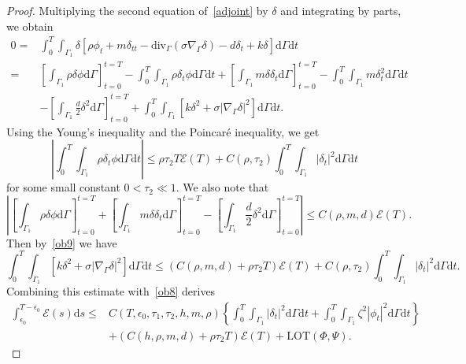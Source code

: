 \documentclass[10pt]{elsarticle}
\begin{document}
\begin{proof}
Multiplying the second equation of~\eqref{adjoint} by $\delta$ and integrating by parts, we obtain
\begin{equation}\label{ob9}
\begin{split}
0= &\int_{0}^{T}\int_{\Gamma_1}\delta\left[\rho\phi_t + m \delta_{tt} - \mathrm{div}_{\Gamma}\left(\sigma\nabla_{\Gamma} \delta\right) - d \delta_t + k \delta\right]\mathrm{d}\Gamma \mathrm{d}t\\
=&\left[ \int_{\Gamma_1}\rho\delta\phi\mathrm{d}\Gamma\right]_{t=0}^{t=T} -\int_{0}^{T}\int_{\Gamma_1}\rho\delta_t\phi \mathrm{d}\Gamma \mathrm{d}t +\left[ \int_{\Gamma_1}m\delta\delta_t\mathrm{d}\Gamma\right]_{t=0}^{t=T} -\int_{0}^{T}\int_{\Gamma_1}m\delta^2_t \mathrm{d}\Gamma \mathrm{d}t\\
&-\left[ \int_{\Gamma_1}\frac{d}{2}\delta^2\mathrm{d}\Gamma\right]_{t=0}^{t=T} +\int_{0}^{T}\int_{\Gamma_1}\left[k \delta^2 + \sigma|\nabla_{\Gamma} \delta|^2\right]\mathrm{d}\Gamma \mathrm{d}t.
\end{split}
\end{equation}
Using the Young's inequality and the Poincar\'e inequality, we get
\[
\left|\int_{0}^{T}\int_{\Gamma_1}\rho\delta_t\phi \mathrm{d}\Gamma \mathrm{d}t\right|\leqslant\rho\tau_2 T\mathcal{E}(T) + C(\rho, \tau_2)\int_{0}^{T}\int_{\Gamma_1}|\delta_t|^2 \mathrm{d}\Gamma \mathrm{d}t
\]
for some small constant $0<\tau_2\ll1$. We also note that
\[
\left| \left[ \int_{\Gamma_1}\rho\delta\phi\mathrm{d}\Gamma\right]_{t=0}^{t=T} + \left[ \int_{\Gamma_1}m\delta\delta_t\mathrm{d}\Gamma\right]_{t=0}^{t=T} -\left[ \int_{\Gamma_1}\frac{d}{2}\delta^2\mathrm{d}\Gamma\right]_{t=0}^{t=T}\right|\leqslant C(\rho, m, d)\mathcal{E}(T).
\]
Then by~\eqref{ob9} we have
\begin{equation}\label{ob9_1}
\int_{0}^{T}\int_{\Gamma_1}\left[k \delta^2 + \sigma|\nabla_{\Gamma} \delta|^2\right]\mathrm{d}\Gamma \mathrm{d}t\leqslant \left(C(\rho, m, d)+\rho\tau_2 T\right)\mathcal{E}(T) + C(\rho, \tau_2)\int_{0}^{T}\int_{\Gamma_1}|\delta_t|^2 \mathrm{d}\Gamma \mathrm{d}t.
\end{equation}
Combining this estimate with~\eqref{ob8} derives
\begin{equation}\label{ob10}
\begin{split}
\int_{\epsilon_0}^{T-\epsilon_0}\mathcal{E}(s)\mathrm{d}s \leqslant &C(T, \epsilon_0, \tau_1, \tau_2, h, m, \rho)\left\{\int_{0}^{T}\int_{\Gamma_1} |\delta_t|^2 \mathrm{d}\Gamma \mathrm{d}t +\int_{0}^{T}\int_{\Gamma_1}\zeta^2|\phi_t|^2 \mathrm{d}\Gamma \mathrm{d}t\right\}\\
&+\left(C(h, \rho, m, d)+\rho\tau_2 T\right)\mathcal{E}(T) +\textrm{LOT}(\Phi, \Psi).
\end{split}
\end{equation}


\end{proof}
\end{document}
